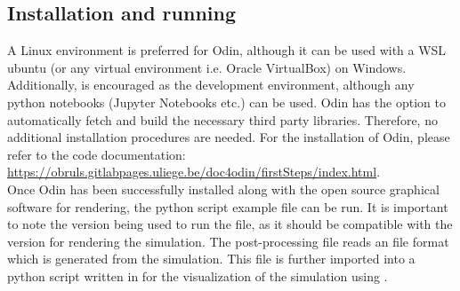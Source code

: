\subsection{Installation and running}
A Linux environment is preferred for Odin, although it can be used with a WSL ubuntu (or any virtual environment i.e. Oracle VirtualBox) on Windows. Additionally,  is encouraged as the development environment, although any python notebooks (Jupyter Notebooks etc.) can be used. Odin has the option to automatically fetch and build the necessary third party libraries. Therefore, no additional installation procedures are needed. For the installation of Odin, please refer to the code documentation: \url{https://obruls.gitlabpages.uliege.be/doc4odin/firstSteps/index.html}.\\

Once Odin has been successfully installed along with the open source graphical software  for rendering, the python script example file can be run. It is important to note the  version being used to run the file, as it should be compatible with the  version for rendering the simulation. The post-processing file reads an  file format which is generated from the simulation. This  file is further imported into a python script written in  for the visualization of the simulation using . 
